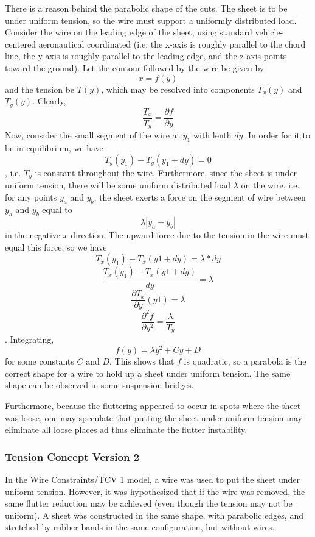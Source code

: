 \documentclass[12pt]{report} %
\begin{document}
There is a reason behind the parabolic shape of the cuts.  The sheet is to be under uniform tension, so the wire must support a uniformly
distributed load.  Consider the wire on the leading edge of the sheet, using standard vehicle-centered aeronautical coordinated (i.e. the
x-axis is roughly parallel to the chord line, the y-axis is roughly parallel to the leading edge, and the z-axis points toward the ground).
 Let the contour followed by the wire be given by
\[x = f(y)\]
and the tension be $T(y)$, which may be resolved into components $T_x(y)$ and $T_y(y)$.  Clearly,
\[\frac{T_x}{T_y} = \frac{\partial f}{\partial y}\]
Now, consider the small segment of the wire at $y_1$ with lenth $dy$.  In order for it to be in equilibrium, we have
\[T_y(y_1) - T_y(y_1 + dy) = 0\],
i.e. $T_y$ is constant throughout the wire.  Furthermore, since the sheet is under uniform tension, there will be some uniform distributed
load $\lambda$ on the wire, i.e. for any points $y_a$ and $y_b$, the sheet exerts a force on the segment of wire between $y_a$ and $y_b$
equal to
\[\lambda |y_a - y_b|\]
in the negative $x$ direction.  The upward force due to the tension in the wire must equal this force, so we have
\[T_x(y_1) - T_x(y1 + dy) = \lambda*dy\]
\[\frac{T_x(y_1) - T_x(y1 + dy)}{dy} = \lambda\]
\[\frac{\partial T_x}{\partial y}(y1) = \lambda\]
\[\frac{\partial^2 f}{\partial y^2} = \frac{\lambda}{T_y}\].
Integrating,
\[f(y) = \lambda y^2 + Cy + D\]
for some constants $C$ and $D$.  This shows that $f$ is quadratic, so a parabola is the correct shape for a wire to hold up a sheet under
uniform tension.  The same shape can be observed in some suspension bridges.

Furthermore, because the fluttering appeared to occur in spots where the sheet was loose, one may speculate that putting the sheet under
uniform tension may eliminate all loose places ad thus eliminate the flutter instability.

\subsubsection{Tension Concept Version 2}

In the Wire Constraints/TCV 1 model, a wire was used to put the sheet under uniform tension.  However, it was hypothesized that if the wire
was removed, the same flutter reduction may be achieved (even though the tension may not be uniform).  A sheet was constructed in the same
shape, with parabolic edges, and stretched by rubber bands in the same configuration, but without wires.
\end{document}

